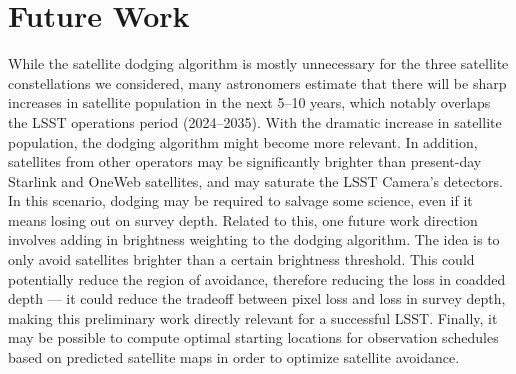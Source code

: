 \documentclass[linenumbers]{aastex631}
\begin{document}
\section{Future Work}
While the satellite dodging algorithm is mostly unnecessary for the three satellite
constellations we considered, many astronomers estimate that there will be sharp increases in
satellite population in the next 5–10 years, which notably overlaps the LSST operations period
(2024–2035). With the dramatic increase in satellite population, the dodging algorithm might
become more relevant. In addition, satellites from other operators may be significantly brighter
than present-day Starlink and OneWeb satellites, and may saturate the LSST Camera’s detectors.
In this scenario, dodging may be required to salvage some science, even if it means losing out on
survey depth.
Related to this, one future work direction involves adding in brightness weighting to the
dodging algorithm. The idea is to only avoid satellites brighter than a certain brightness
threshold. This could potentially reduce the region of avoidance, therefore reducing the loss in
coadded depth — it could reduce the tradeoff between pixel loss and loss in survey depth,
making this preliminary work directly relevant for a successful LSST. Finally, it may be possible
to compute optimal starting locations for observation schedules based on predicted satellite maps
in order to optimize satellite avoidance.






{}

\end{document}
